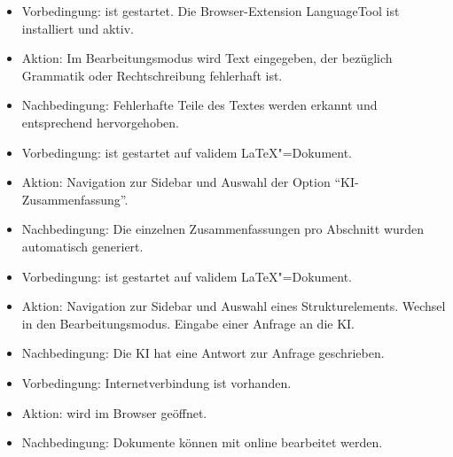 
\begin{itemize}
\item Vorbedingung: \texla{} ist gestartet.
  Die Browser-Extension LanguageTool ist installiert und aktiv.
  \item Aktion: Im Bearbeitungsmodus wird Text eingegeben, der bezüglich Grammatik oder Rechtschreibung fehlerhaft
  ist.
  \item Nachbedingung: Fehlerhafte Teile des Textes werden erkannt und entsprechend hervorgehoben.

\end{itemize}

\begin{itemize}
\item Vorbedingung: \texla{} ist gestartet auf validem \LaTeX"=Dokument.
  \item Aktion: Navigation zur Sidebar und Auswahl der Option \enquote{KI-Zusammenfassung}.
  \item Nachbedingung: Die einzelnen Zusammenfassungen pro Abschnitt wurden automatisch generiert.

\end{itemize}

\begin{itemize}
\item Vorbedingung: \texla{} ist gestartet auf validem \LaTeX"=Dokument.
  \item Aktion: Navigation zur Sidebar und Auswahl eines Strukturelements.
  Wechsel in den Bearbeitungsmodus.
  Eingabe einer Anfrage an die KI.
  \item Nachbedingung: Die KI hat eine Antwort zur Anfrage geschrieben.

\end{itemize}

\begin{itemize}
\item Vorbedingung: Internetverbindung ist vorhanden.
  \item Aktion: \texla{} wird im Browser geöffnet.
  \item Nachbedingung: Dokumente können mit \texla{} online bearbeitet werden.

\end{itemize}
\clearpage

